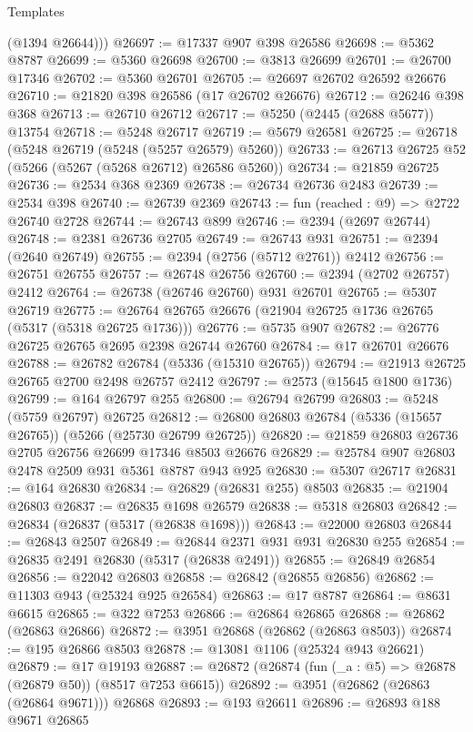 \begin{lexlean}{Templates}
\begin{coremodule}
        (@1394 @26644)))
@26697 := @17337 @907 @398 @26586
@26698 := @5362 @8787
@26699 := @5360 @26698
@26700 := @3813 @26699
@26701 := @26700 @17346
@26702 := @5360 @26701
@26705 := @26697 @26702 @26592 @26676
@26710 := @21820 @398 @26586 (@17 @26702 @26676)
@26712 := @26246 @398 @368
@26713 := @26710 @26712
@26717 := @5250 (@2445 (@2688 @5677)) @13754
@26718 := @5248 @26717
@26719 := @5679 @26581
@26725 := @26718 (@5248 @26719 (@5248 (@5257 @26579) @5260))
@26733 := @26713 @26725 @52 (@5266 (@5267 (@5268 @26712) @26586 @5260))
@26734 := @21859 @26725
@26736 := @2534 @368 @2369
@26738 := @26734 @26736 @2483
@26739 := @2534 @398
@26740 := @26739 @2369
@26743 := fun (reached : @9) => @2722 @26740 @2728
@26744 := @26743 @899
@26746 := @2394 (@2697 @26744)
@26748 := @2381 @26736 @2705
@26749 := @26743 @931
@26751 := @2394 (@2640 @26749)
@26755 := @2394 (@2756 (@5712 @2761)) @2412
@26756 := @26751 @26755
@26757 := @26748 @26756
@26760 := @2394 (@2702 @26757) @2412
@26764 := @26738 (@26746 @26760) @931 @26701
@26765 := @5307 @26719
@26775 := @26764 @26765 @26676 (@21904 @26725 @1736 @26765 (@5317 (@5318 @26725 @1736)))
@26776 := @5735 @907
@26782 := @26776 @26725 @26765 @2695 @2398 @26744 @26760
@26784 := @17 @26701 @26676
@26788 := @26782 @26784 (@5336 (@15310 @26765))
@26794 := @21913 @26725 @26765 @2700 @2498 @26757 @2412
@26797 := @2573 (@15645 @1800 @1736)
@26799 := @164 @26797 @255
@26800 := @26794 @26799
@26803 := @5248 (@5759 @26797) @26725
@26812 := @26800 @26803 @26784 (@5336 (@15657 @26765)) (@5266 (@25730 @26799 @26725))
@26820 := @21859 @26803 @26736 @2705 @26756 @26699 @17346 @8503 @26676
@26829 := @25784 @907 @26803 @2478 @2509 @931 @5361 @8787 @943 @925
@26830 := @5307 @26717
@26831 := @164 @26830
@26834 := @26829 (@26831 @255) @8503
@26835 := @21904 @26803
@26837 := @26835 @1698 @26579
@26838 := @5318 @26803
@26842 := @26834 (@26837 (@5317 (@26838 @1698)))
@26843 := @22000 @26803
@26844 := @26843 @2507
@26849 := @26844 @2371 @931 @931 @26830 @255
@26854 := @26835 @2491 @26830 (@5317 (@26838 @2491))
@26855 := @26849 @26854
@26856 := @22042 @26803
@26858 := @26842 (@26855 @26856)
@26862 := @11303 @943 (@25324 @925 @26584)
@26863 := @17 @8787
@26864 := @8631 @6615
@26865 := @322 @7253
@26866 := @26864 @26865
@26868 := @26862 (@26863 @26866)
@26872 := @3951 @26868 (@26862 (@26863 @8503))
@26874 := @195 @26866 @8503
@26878 := @13081 @1106 (@25324 @943 @26621)
@26879 := @17 @19193
@26887 := @26872 (@26874 (fun (_a : @5) => @26878 (@26879 @50)) (@8517 @7253 @6615))
@26892 := @3951 (@26862 (@26863 (@26864 @9671))) @26868
@26893 := @193 @26611
@26896 := @26893 @188 @9671 @26865

\end{coremodule}
\end{lexlean}
